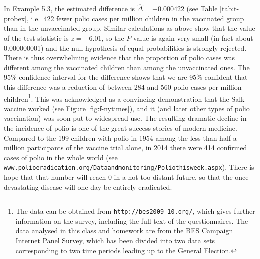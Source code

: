 \documentclass[11pt,a4paper,openany]{book}
\let\rmarkdownfootnote\footnote%
\def\footnote{\protect\rmarkdownfootnote}
\begin{document}
In Example 5.3, the estimated difference is \(\hat{\Delta}=-0.000422\)
(see Table \ref{tab:t-probex}, i.e.~422 fewer polio cases per million
children in the vaccinated group than in the unvaccinated group. Similar
calculations as above show that the value of the test statistic is
\(z=-6.01\), so the \(P\)-value is again very small (in fact about
0.000000001) and the null hypothesis of equal probabilities is strongly
rejected. There is thus overwhelming evidence that the proportion of
polio cases was different among the vaccinated children than among the
unvaccinated ones. The 95\% confidence interval for the difference shows
that we are 95\% confident that this difference was a reduction of
between 284 and 560 polio cases per million children\footnote{The data
  can be obtained from \texttt{http://bes2009-10.org/}, which gives
  further information on the survey, including the full text of the
  questionnaires. The data analysed in this class and homework are from
  the BES Campaign Internet Panel Survey, which has been divided into
  two data sets corresponding to two time periods leading up to the
  General Election.}. This was acknowledged as a convincing
demonstration that the Salk vaccine worked (see Figure
\ref{fig:f-nytimes}), and it (and later other types of polio
vaccination) was soon put to widespread use. The resulting dramatic
decline in the incidence of polio is one of the great success stories of
modern medicine. Compared to the 199 children with polio in 1954 among
the less than half a million participants of the vaccine trial alone, in
2014 there were 414 confirmed cases of polio in the whole world (see
\texttt{www.polioeradication.org/Dataandmonitoring/Poliothisweek.aspx}).
There is hope that that number will reach 0 in a not-too-distant future,
so that the once devastating disease will one day be entirely
eradicated.
\end{document}
